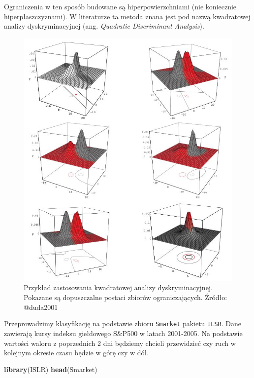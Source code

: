 \documentclass[]{book}
\newenvironment{Shaded}{\begin{snugshade}}{\end{snugshade}}
\newcommand{\KeywordTok}[1]{\textcolor[rgb]{0.13,0.29,0.53}{\textbf{#1}}}
\newcommand{\NormalTok}[1]{#1}
\theoremstyle{plain}
\theoremstyle{definition}
\theoremstyle{definition}
\theoremstyle{definition}
\theoremstyle{definition}
\theoremstyle{remark}
\let\BeginKnitrBlock\begin \let\EndKnitrBlock\end
\begin{document}
Ograniczenia w ten sposób budowane są hiperpowierzchniami (nie koniecznie hiperpłaszczyznami). W literaturze ta metoda znana jest pod nazwą kwadratowej analizy dyskryminacyjnej (ang. \emph{Quadratic Discriminant Analysis}).

\begin{figure}

{\centering \includegraphics{images/dyskrym3} 

}

\caption{Przykład zastosowania kwadratowej analizy dyskryminacyjnej. Pokazane są dopuszczalne postaci zbiorów ograniczających. Źródło: @duda2001}\label{fig:hiper3}
\end{figure}

\BeginKnitrBlock{example}
\protect\hypertarget{exm:caravan}{}{\label{exm:caravan} }Przeprowadzimy klasyfikację na podstawie zbioru \texttt{Smarket} pakietu \texttt{ILSR}. Dane zawierają kursy indeksu giełdowego S\&P500 w latach 2001-2005. Na podstawie wartości waloru z poprzednich 2 dni będziemy chcieli przewidzieć czy ruch w kolejnym okresie czasu będzie w górę czy w dół.
\EndKnitrBlock{example}

\begin{Shaded}
\begin{Highlighting}[]
\KeywordTok{library}\NormalTok{(ISLR)}
\KeywordTok{head}\NormalTok{(Smarket)}
\end{Highlighting}
\end{Shaded}
\end{document}
